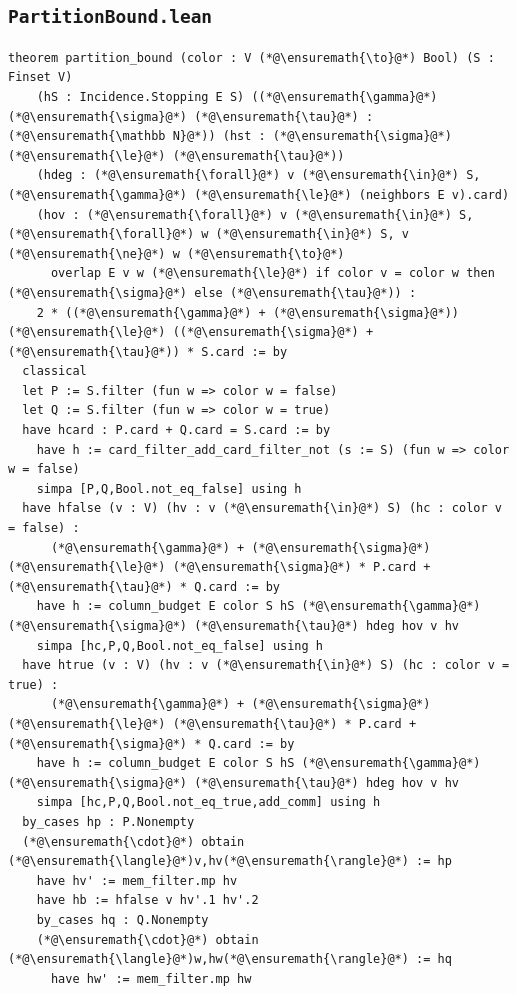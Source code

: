 \subsection*{\texttt{PartitionBound.lean}}
\begin{lstlisting}
theorem partition_bound (color : V (*@\ensuremath{\to}@*) Bool) (S : Finset V)
    (hS : Incidence.Stopping E S) ((*@\ensuremath{\gamma}@*) (*@\ensuremath{\sigma}@*) (*@\ensuremath{\tau}@*) : (*@\ensuremath{\mathbb N}@*)) (hst : (*@\ensuremath{\sigma}@*) (*@\ensuremath{\le}@*) (*@\ensuremath{\tau}@*))
    (hdeg : (*@\ensuremath{\forall}@*) v (*@\ensuremath{\in}@*) S, (*@\ensuremath{\gamma}@*) (*@\ensuremath{\le}@*) (neighbors E v).card)
    (hov : (*@\ensuremath{\forall}@*) v (*@\ensuremath{\in}@*) S, (*@\ensuremath{\forall}@*) w (*@\ensuremath{\in}@*) S, v (*@\ensuremath{\ne}@*) w (*@\ensuremath{\to}@*)
      overlap E v w (*@\ensuremath{\le}@*) if color v = color w then (*@\ensuremath{\sigma}@*) else (*@\ensuremath{\tau}@*)) :
    2 * ((*@\ensuremath{\gamma}@*) + (*@\ensuremath{\sigma}@*)) (*@\ensuremath{\le}@*) ((*@\ensuremath{\sigma}@*) + (*@\ensuremath{\tau}@*)) * S.card := by
  classical
  let P := S.filter (fun w => color w = false)
  let Q := S.filter (fun w => color w = true)
  have hcard : P.card + Q.card = S.card := by
    have h := card_filter_add_card_filter_not (s := S) (fun w => color w = false)
    simpa [P,Q,Bool.not_eq_false] using h
  have hfalse (v : V) (hv : v (*@\ensuremath{\in}@*) S) (hc : color v = false) :
      (*@\ensuremath{\gamma}@*) + (*@\ensuremath{\sigma}@*) (*@\ensuremath{\le}@*) (*@\ensuremath{\sigma}@*) * P.card + (*@\ensuremath{\tau}@*) * Q.card := by
    have h := column_budget E color S hS (*@\ensuremath{\gamma}@*) (*@\ensuremath{\sigma}@*) (*@\ensuremath{\tau}@*) hdeg hov v hv
    simpa [hc,P,Q,Bool.not_eq_false] using h
  have htrue (v : V) (hv : v (*@\ensuremath{\in}@*) S) (hc : color v = true) :
      (*@\ensuremath{\gamma}@*) + (*@\ensuremath{\sigma}@*) (*@\ensuremath{\le}@*) (*@\ensuremath{\tau}@*) * P.card + (*@\ensuremath{\sigma}@*) * Q.card := by
    have h := column_budget E color S hS (*@\ensuremath{\gamma}@*) (*@\ensuremath{\sigma}@*) (*@\ensuremath{\tau}@*) hdeg hov v hv
    simpa [hc,P,Q,Bool.not_eq_true,add_comm] using h
  by_cases hp : P.Nonempty
  (*@\ensuremath{\cdot}@*) obtain (*@\ensuremath{\langle}@*)v,hv(*@\ensuremath{\rangle}@*) := hp
    have hv' := mem_filter.mp hv
    have hb := hfalse v hv'.1 hv'.2
    by_cases hq : Q.Nonempty
    (*@\ensuremath{\cdot}@*) obtain (*@\ensuremath{\langle}@*)w,hw(*@\ensuremath{\rangle}@*) := hq
      have hw' := mem_filter.mp hw

\end{lstlisting}

